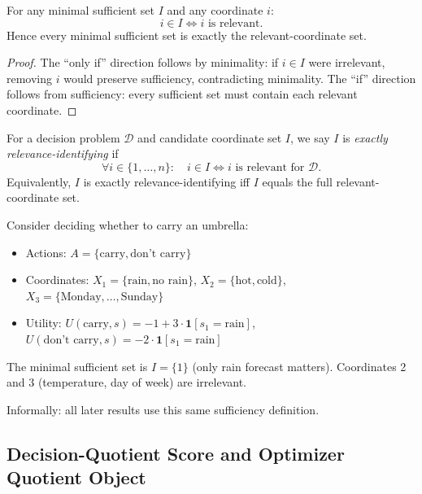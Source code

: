 \begin{proposition}\label{prop:minimal-relevant-equiv}
For any minimal sufficient set $I$ and any coordinate $i$:
\[
i \in I \iff i \text{ is relevant}.
\]
Hence every minimal sufficient set is exactly the relevant-coordinate set.
\end{proposition}

\begin{proof}
The ``only if'' direction follows by minimality: if $i\in I$ were irrelevant, removing $i$ would preserve sufficiency, contradicting minimality. The ``if'' direction follows from sufficiency: every sufficient set must contain each relevant coordinate.
\end{proof}

\begin{definition}\label{def:exact-identifiability}
For a decision problem $\mathcal{D}$ and candidate coordinate set $I$, we say $I$ is \emph{exactly relevance-identifying} if
\[
\forall i \in \{1,\ldots,n\}:\quad i \in I \iff i \text{ is relevant for } \mathcal{D}.
\]
Equivalently, $I$ is exactly relevance-identifying iff $I$ equals the full relevant-coordinate set.
\end{definition}

\begin{example}
Consider deciding whether to carry an umbrella:
\begin{itemize}
\item Actions: $A = \{\text{carry}, \text{don't carry}\}$
\item Coordinates: $X_1 = \{\text{rain}, \text{no rain}\}$, $X_2 = \{\text{hot}, \text{cold}\}$, $X_3 = \{\text{Monday}, \ldots, \text{Sunday}\}$
\item Utility: $U(\text{carry}, s) = -1 + 3 \cdot \mathbf{1}[s_1 = \text{rain}]$, $U(\text{don't carry}, s) = -2 \cdot \mathbf{1}[s_1 = \text{rain}]$
\end{itemize}

The minimal sufficient set is $I = \{1\}$ (only rain forecast matters). Coordinates 2 and 3 (temperature, day of week) are irrelevant.
\end{example}

Informally: all later results use this same sufficiency definition.

\subsection{Decision-Quotient Score and Optimizer Quotient Object}

